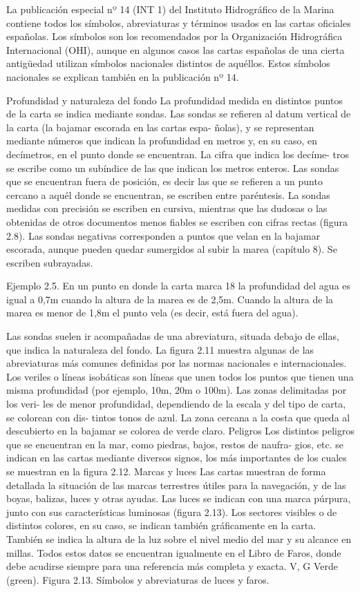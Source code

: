 La publicación especial nº 14 (INT 1) del Instituto Hidrográfico de la Marina contiene 
todos los símbolos, abreviaturas y términos usados en las cartas oficiales españolas. Los 
símbolos son los recomendados por la Organización Hidrográfica Internacional (OHI), 
aunque en algunos casos las cartas españolas de una cierta antigüedad utilizan símbolos 
nacionales distintos de aquéllos. Estos símbolos nacionales se explican también en la 
publicación nº 14. 


Profundidad y naturaleza del fondo 
La profundidad medida en distintos puntos 
de la carta se indica mediante sondas. Las 
sondas se refieren al datum vertical de la 
carta (la bajamar escorada en las cartas espa- 
ñolas), y se representan mediante números 
que indican la profundidad en metros y, en su 
caso, en decímetros, en el punto donde se 
encuentran. La cifra que indica los decíme- 
tros se escribe como un subíndice de las que 
indican los metros enteros. Las sondas que se 
encuentran fuera de posición, es decir las que 
se refieren a un punto cercano a aquél donde 
se encuentran, se escriben entre paréntesis. 
La sondas medidas con precisión se escriben 
en cursiva, mientras que las dudosas o las 
obtenidas de otros documentos menos fiables 
se escriben con cifras rectas (figura 2.8). 
Las sondas negativas corresponden a 
puntos que velan en la bajamar escorada, aunque pueden quedar sumergidos al subir la 
marea (capítulo 8). Se escriben subrayadas. 

Ejemplo 2.5. En un punto en donde la carta marca 18 la profundidad del agua es igual a 0,7m cuando 
la altura de la marea es de 2,5m. Cuando la altura de la marea es menor de 1,8m el punto vela (es 
decir, está fuera del agua). 


Las sondas suelen ir acompañadas de una
abreviatura, situada debajo de ellas, que
indica la naturaleza del fondo. La figura 2.11
muestra algunas de las abreviaturas más
comunes definidas por las normas nacionales
e internacionales. 
Los veriles o líneas isobáticas son líneas
que unen todos los puntos que tienen una
misma profundidad (por ejemplo, 10m, 20m
o 100m). Las zonas delimitadas por los veri-
les de menor profundidad, dependiendo de la
escala y del tipo de carta, se colorean con dis-
tintos tonos de azul. La zona cercana a la
costa que queda al descubierto en la bajamar
se colorea de verde claro. 
 Peligros 
Los distintos peligros que se encuentran en la
mar, como piedras, bajos, restos de naufra-
gios, etc. se indican en las cartas mediante
diversos signos, los más importantes de los
cuales se muestran en la figura 2.12. 
Marcas y luces 
Las cartas muestran de forma detallada la
situación de las marcas terrestres útiles para la
navegación, y de las boyas, balizas, luces y
otras ayudas. Las luces se indican con una
marca púrpura, junto con sus características
luminosas (figura 2.13). Los sectores visibles
o de distintos colores, en su caso, se indican
también gráficamente en la carta. También se
indica la altura de la luz sobre el nivel medio
del mar y su alcance en millas. Todos estos
datos se encuentran igualmente en el Libro de 
Faros, donde debe acudirse siempre para una 
referencia más completa y exacta. 
V, G Verde (green). 
Figura 2.13. Símbolos y abreviaturas 
de luces y faros.

